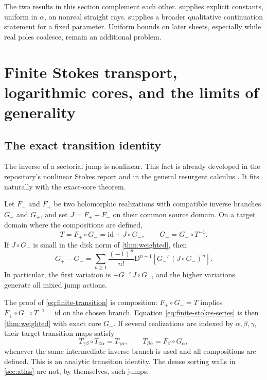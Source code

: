 \documentclass[11pt,a4paper]{article}
\numberwithin{equation}{section}
\theoremstyle{definition}
\theoremstyle{remark}
\newcommand{\D}{\mathrm D}
\newcommand{\id}{\mathrm{id}}
\begin{document}
The two results in this section complement each other.
 supplies explicit constants, uniform in
$\alpha$, on nonreal straight rays.
 supplies a broader qualitative continuation
statement for a fixed parameter.
Uniform bounds on later sheets, especially while real poles coalesce,
remain an additional problem.

\section{Finite Stokes transport, logarithmic cores, and the limits of generality}
\label{sec:transport}

\subsection{The exact transition identity}

The inverse of a sectorial jump is nonlinear.
This fact is already developed in the repository's nonlinear Stokes
report \cite{repo-stokes} and in the general resurgent calculus
\cite{sauzin-notes}. It fits naturally with the exact-core theorem.

Let $F_-$ and $F_+$ be two holomorphic realizations with compatible
inverse branches $G_-$ and $G_+$, and set $J=F_+-F_-$ on their common
source domain. On a target domain where the compositions are defined,
\begin{equation}\label{eq:finite-transition}
 T=F_+\circ G_-=\id+J\circ G_-,
 \qquad
 G_+=G_-\circ T^{-1}.
\end{equation}
If $J\circ G_-$ is small in the disk norm of \cref{thm:weighted},
then
\begin{equation}\label{eq:finite-stokes-series}
 G_+-G_-=
 \sum_{n\ge1}\frac{(-1)^n}{n!}
 \D^{n-1}\!\left[G_-'\,(J\circ G_-)^n\right].
\end{equation}
In particular, the first variation is
$-G_-'\,J\circ G_-$, and the higher variations generate all mixed
jump actions.

The proof of \eqref{eq:finite-transition} is composition:
$F_+\circ G_-=T$ implies
$F_+\circ G_-\circ T^{-1}=\id$ on the chosen branch.
Equation \eqref{eq:finite-stokes-series} is then
\cref{thm:weighted} with exact core $G_-$.
If several realizations are indexed by $\alpha,\beta,\gamma$, their
target transition maps satisfy
\[
 T_{\gamma\beta}\circ T_{\beta\alpha}=T_{\gamma\alpha},
 \qquad T_{\beta\alpha}=F_\beta\circ G_\alpha,
\]
whenever the same intermediate inverse branch is used and all
compositions are defined.
This is an analytic transition identity. The dense sorting walls
in \cref{sec:atlas} are not, by themselves, such jumps.
\end{document}
